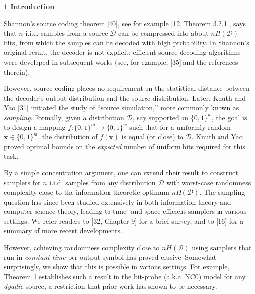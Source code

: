 

\par\medskip\noindent\textbf{
1 Introduction}\par




Shannon’s source coding theorem [40], see for example [12, Theorem 3.2.1], says that $n$ i.i.d. samples from a source $\mathcal{D}$ can be compressed into about $nH(\mathcal{D})$ bits, from which the samples can be decoded with high probability. In Shannon’s original result, the decoder is not explicit; efficient source decoding algorithms were developed in subsequent works (see, for example, [35] and the references therein).\par




However, source coding places no requirement on the statistical distance between the decoder’s output distribution and the source distribution.
Later, Knuth and Yao [31] initiated the study of “source simulation,” more commonly known as \emph{sampling}.
Formally, given a distribution $\mathcal{D}$, say supported on $\{0,1\}^{w}$, the goal is to design a mapping $f\colon\{0,1\}^{m}\to\{0,1\}^{w}$ such that for a uniformly random $\boldsymbol{x}\in\{0,1\}^{m}$, the distribution of $f(\boldsymbol{x})$ is equal (or close) to $\mathcal{D}$.
Knuth and Yao proved optimal bounds on the \emph{expected} number of uniform bits required for this task.\par




By a simple concentration argument, one can extend their result to construct samplers for $n$ i.i.d. samples from any distribution $\mathcal{D}$ with worst-case randomness complexity close to the information-theoretic optimum $nH(\mathcal{D})$.
The sampling question has since been studied extensively in both information theory and computer science theory, leading to time- and space-efficient samplers in various settings.
We refer readers to [32, Chapter 9] for a brief survey, and to [16] for a summary of more recent developments.\par




However, achieving randomness complexity close to $nH(\mathcal{D})$ using samplers that run in \emph{constant time} per output symbol has proved elusive.
Somewhat surprisingly, we show that this is possible in various settings.
For example, Theorem 1 establishes such a result in the bit-probe (a.k.a. NC0) model for any \emph{dyadic} source, a restriction that prior work has shown to be necessary.\par




